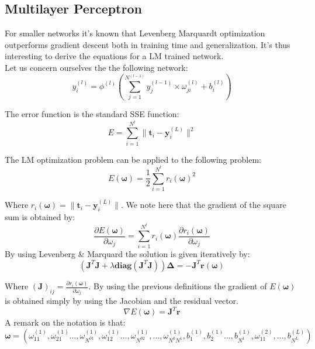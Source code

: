\documentclass[a4paper,10pt]{article}
\theoremstyle{definition}
\begin{document}
\subsection{Multilayer Perceptron}
For smaller networks it's known that Levenberg Marquardt optimization outperforms gradient descent both in training time and generalization. It's thus interesting to derive the equations for a LM trained network.\\

Let us concern ourselves the the following network:
\begin{equation}
	y^{(l)}_i= \phi^{(l)}(\sum_{j=1}^{N^{(l-1)}} y^{(l-1)}_j\times \omega^{(l)}_{ji} + b^{(l)}_i)
\end{equation}

The error function is the standard SSE function:
\begin{equation}
	E = \sum_{i=1}^{N^t}\parallel \pmb{t}_i - \pmb{y}^{(L)}_{i}\parallel^2
\end{equation}

The LM optimization problem can be applied to the following problem:
\begin{equation}
	E(\pmb{\omega}) = \frac{1}{2}\sum_{i=1}^{N^t}r_i(\pmb{\omega})^2
\end{equation}

Where $r_i(\pmb{\omega}) = \parallel \pmb{t}_i - \pmb{y}^{(L)}_{i}\parallel$. We note here that the gradient of the square sum is obtained by:
\begin{equation}
	\frac{\partial E(\pmb{\omega})}{\partial \omega_j} = \sum_{i=1}^{N^t}r_i(\pmb{\omega})\frac{\partial r_i(\pmb{\omega})}{\partial \omega_j}
\end{equation} 
By using Levenberg \& Marquard the solution is given iteratively by:
\begin{equation}
	(\pmb{J}^T\pmb{J} + \lambda\pmb{diag}(\pmb{J}^T\pmb{J}))\pmb{\Delta} = -\pmb{J}^T\pmb{r}(\pmb{\omega})
\end{equation}

Where $(\pmb{J})_{ij} = \frac{\partial r_i(\pmb{\omega})}{\partial \omega_j}$. By using the previous definitions the gradient of $E(\pmb{\omega})$ is obtained simply by using the Jacobian and the residual vector. 
\begin{equation}
	\nabla E(\pmb{\omega}) = \pmb{J}^T \pmb{r}
\end{equation}
A remark on the notation is that:\\
\begin{equation*}
	\pmb{\omega} = (\omega^{(1)}_{11}, \omega^{(1)}_{21} \hdots, \omega^{(1)}_{N^01}, \omega^{(1)}_{12} \hdots, \omega^{(1)}_{N^02}, \hdots, \omega^{(1)}_{N^0N^1},b^{(1)}_1, b^{(1)}_2\hdots, b^{(1)}_{N^1}, \omega^{(2)}_{11}, \hdots, b^{(L)}_{N^L})
\end{equation*}
\end{document}
